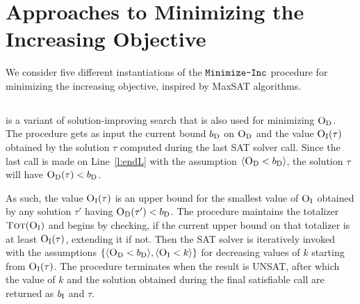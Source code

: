 \section{Approaches to Minimizing the Increasing Objective\label{sec:variants}}

We consider five different instantiations of the $\texttt{Minimize-\allowbreak{}Inc}$ procedure for minimizing the increasing objective, inspired by MaxSAT algorithms. 

\subsection{\satunsat{}\label{sec:sat-unsat}}

\satunsat{} is a variant of solution-improving search that is also used for minimizing $\textsc{O}_{\text{D}}$. 
The procedure gets as input the current bound $b_{\text{D}}$ on $\textsc{O}_{\text{D}}$ and the value $\textsc{O}_{\text{I}}(\tau)$ obtained by the solution $\tau$ computed during the last SAT solver call. 
Since the last call is made on Line~\ref{l:endL} with the assumption $\langle \textsc{O}_{\text{D}} < b_{\text{D}} \rangle$, the solution $\tau$ will have $\textsc{O}_{\text{D}}(\tau) < b_{\text{D}}$. 

As such, the value $\textsc{O}_{\text{I}}(\tau)$ is an upper bound for the smallest value of $\textsc{O}_{\text{I}}$ obtained by any solution $\tau'$ having $\textsc{O}_{\text{D}}(\tau') < b_{\text{D}}$.
The procedure \satunsat{} maintains the totalizer $\textsc{Tot}(\textsc{O}_{\text{I}})$ and begins by checking, if the current upper bound on that totalizer is at least $\textsc{O}_{\text{I}}(\tau)$, extending it if not. 
Then the SAT solver is iteratively invoked with the assumptions $\{\langle \textsc{O}_{\text{D}} < b_{\text{D}} \rangle, \langle \textsc{O}_{\text{I}} < k \rangle\}$ for decreasing values of $k$ starting from $\textsc{O}_{\text{I}}(\tau)$.
The procedure terminates when the result is UNSAT, after which the value of $k$ and the solution obtained during the final satisfiable call are returned as $b_{\text{I}}$ and $\tau$.  


